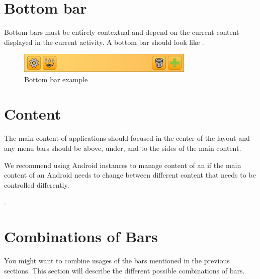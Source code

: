 \FloatBarrier


\section{Bottom bar}
Bottom bars must be entirely contextual and depend on the current content displayed in the current activity. A bottom bar should look like .


\begin{note}
\end{note}

\begin{figure}[!htbp]
    \centering
    \includegraphics[width=0.75\textwidth]{pictures/application_structure/bottombar}
    \caption{Bottom bar example}
    \label{fig:bottom_bar_example}
\end{figure}

\FloatBarrier


\section{Content}
The main content of applications should focused in the center of the layout and any menu bars should be above, under, and to the sides of the main content. 

\begin{note}
We recommend using Android  instances to manage content of an  if the main content of an Android  needs to change between different content that needs to be controlled differently. 
\end{note}

.

\FloatBarrier


\section{Combinations of Bars}
You might want to combine usages of the bars mentioned in the previous sections. This section will describe the different possible combinations of bars.

